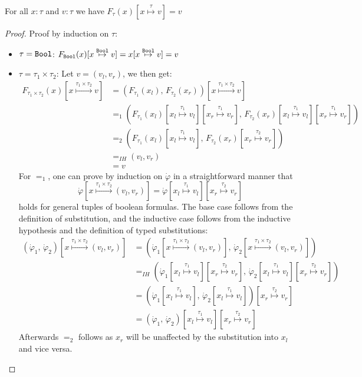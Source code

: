 \begin{lemma}\label{SubstitutionCorrectnessLemma}
	For all $x\colon \tau$ and $v \colon \tau$ we have $F_\tau(x) [x \overset{\tau}{\mapsto} v] = v$
\end{lemma}
\begin{proof}
	Proof by induction on $\tau$:
	\begin{itemize}
		\item $\tau = \texttt{Bool}$: $F_{\texttt{Bool}}(x) [x \overset{\texttt{Bool}}{\mapsto} v] = x [x \overset{\texttt{Bool}}{\mapsto} v] = v$
		\item $\tau = \tau_1 \times \tau_2$: Let $v = (v_l, v_r)$, we then get:
		\begin{align*}
			F_{\tau_1 \times \tau_2}(x) [x \overset{\tau_1 \times \tau_2}{\mapsto} v] &= (F_{\tau_1 }(x_l),\, F_{ \tau_2}(x_r)) [x \overset{\tau_1 \times \tau_2}{\mapsto} v]\\
			&=_1 (F_{\tau_1 }(x_l)[x_l \overset{\tau_1}{\mapsto} v_l][x_r \overset{\tau_1}{\mapsto} v_r],\, F_{ \tau_2}(x_r)[x_l \overset{\tau_1}{\mapsto} v_l][x_r \overset{\tau_1}{\mapsto} v_r])\\
			&=_2 (F_{\tau_1 }(x_l)[x_l \overset{\tau_1}{\mapsto} v_l],\, F_{ \tau_2}(x_r)[x_r \overset{\tau_2}{\mapsto} v_r])\\
			&=_{IH} (v_l, v_r)\\
			&= v
		\end{align*}
		For $=_1$, one can prove by induction on $\dot{\varphi}$ in a straightforward manner that 
		$$\dot{\varphi}[x \overset{\tau_1 \times \tau_2}{\mapsto} (v_l,v_r)] = \dot{\varphi}[x_l \overset{\tau_1}{\mapsto} v_l][x_r \overset{\tau_2}{\mapsto} v_r]$$ 
		holds for general tuples of boolean formulas.
		The base case follows from the definition of substitution, and the inductive case follows from the inductive hypothesis and the definition of typed substitutions:
		\begin{align*}
			(\dot{\varphi}_1,\, \dot{\varphi}_2)[x \overset{\tau_1 \times \tau_2}{\mapsto} (v_l,v_r)]
			&= (\dot{\varphi}_1[x \overset{\tau_1 \times \tau_2}{\mapsto} (v_l,v_r)],\, \dot{\varphi}_2[x \overset{\tau_1 \times \tau_2}{\mapsto} (v_l,v_r)])\\
			&=_{IH} (\dot{\varphi}_1[x_l \overset{\tau_1}{\mapsto} v_l][x_r \overset{\tau_2}{\mapsto} v_r],\, \dot{\varphi}_2[x_l \overset{\tau_1}{\mapsto} v_l][x_r \overset{\tau_2}{\mapsto} v_r])\\
			&= (\dot{\varphi}_1[x_l \overset{\tau_1}{\mapsto} v_l],\, \dot{\varphi}_2[x_l \overset{\tau_1}{\mapsto} v_l])[x_r \overset{\tau_2}{\mapsto} v_r]\\
			&= (\dot{\varphi}_1,\, \dot{\varphi}_2)[x_l \overset{\tau_1}{\mapsto} v_l][x_r \overset{\tau_2}{\mapsto} v_r]
		\end{align*}
		Afterwards $=_2$ follows as $x_r$ will be unaffected by the substitution into $x_l$ and vice versa. 
	\end{itemize}
\end{proof}



